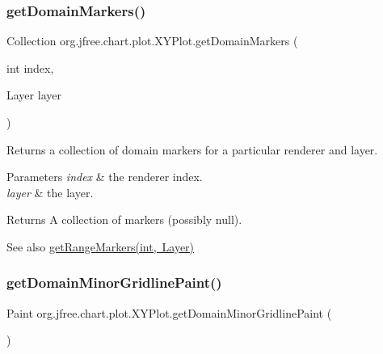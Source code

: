 \subsubsection{\texorpdfstring{get\+Domain\+Markers()}{getDomainMarkers()}\hspace{0.1cm}{\footnotesize\ttfamily [2/2]}}
{\footnotesize\ttfamily Collection org.\+jfree.\+chart.\+plot.\+X\+Y\+Plot.\+get\+Domain\+Markers (\begin{DoxyParamCaption}\item[{int}]{index,  }\item[{Layer}]{layer }\end{DoxyParamCaption})}

Returns a collection of domain markers for a particular renderer and layer.


\begin{DoxyParams}{Parameters}
{\em index} & the renderer index. \\
\hline
{\em layer} & the layer.\\
\hline
\end{DoxyParams}
\begin{DoxyReturn}{Returns}
A collection of markers (possibly {\ttfamily null}).
\end{DoxyReturn}
\begin{DoxySeeAlso}{See also}
\mbox{\hyperlink{classorg_1_1jfree_1_1chart_1_1plot_1_1_x_y_plot_a04c8f145972330dcf231fea3844a09c4}{get\+Range\+Markers(int, Layer)}} 
\end{DoxySeeAlso}
\mbox{\label{classorg_1_1jfree_1_1chart_1_1plot_1_1_x_y_plot_a667ca270fdac660473ef80d4ff591b01}} 
\subsubsection{\texorpdfstring{get\+Domain\+Minor\+Gridline\+Paint()}{getDomainMinorGridlinePaint()}}
{\footnotesize\ttfamily Paint org.\+jfree.\+chart.\+plot.\+X\+Y\+Plot.\+get\+Domain\+Minor\+Gridline\+Paint (\begin{DoxyParamCaption}{ }\end{DoxyParamCaption})}

